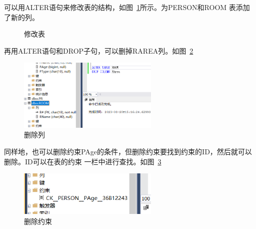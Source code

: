 \documentclass[a4paper,twoside]{article}
\begin{document}
\begin{spacing}{1.2}
可以用ALTER语句来修改表的结构，如图~\ref{fig:sqlalter}所示。为PERSON和ROOM
表添加了新的列。
\begin{figure}[htbp]
    \centering
    \caption{修改表}
    \label{fig:sqlalter}
\end{figure}
再用ALTER语句和DROP子句，可以删掉RAREA列。如图~\ref{fig:delcol}
\begin{figure}[htbp]
    \centering
    \caption{删除列}
    \label{fig:delcol}
    \includegraphics[width=0.6\textwidth]{dropcolumn.png}
\end{figure}
同样地，也可以删除约束PAge的条件，但删除约束要找到约束的ID，然后就可以删除。ID可以在表的约束
一栏中进行查找。如图~\ref{fig:delcons}
\begin{figure}[htbp]
    \centering
    \caption{删除约束}
    \label{fig:delcons}
    \includegraphics[width=0.6\textwidth]{cons.png}
\end{figure}


\end{spacing}
\end{document}
